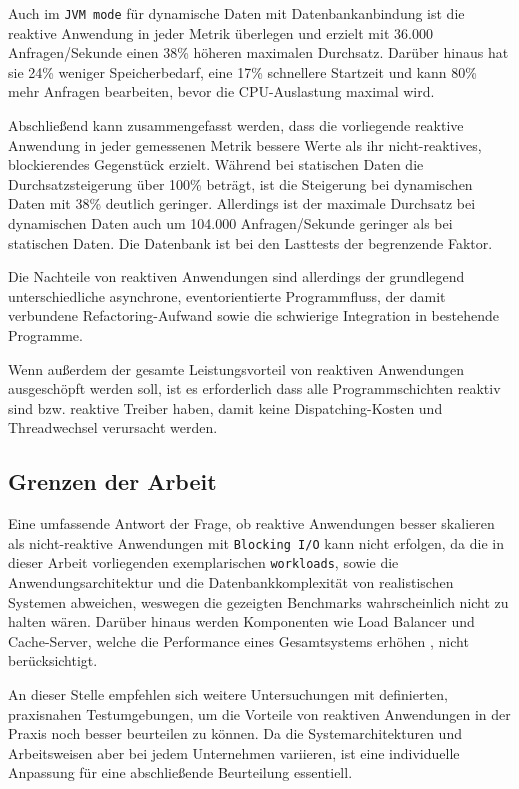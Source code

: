 Auch im \verb|JVM mode| für dynamische Daten mit Datenbankanbindung ist die reaktive Anwendung in jeder Metrik überlegen und erzielt
mit 36.000 Anfragen/Sekunde einen 38\% höheren maximalen Durchsatz. Darüber hinaus hat sie 24\% weniger Speicherbedarf, eine 17\% schnellere
Startzeit und kann 80\% mehr Anfragen bearbeiten, bevor die CPU-Auslastung maximal wird.

Abschließend kann zusammengefasst werden, dass die vorliegende reaktive Anwendung in jeder gemessenen Metrik bessere Werte als ihr
nicht-reaktives, blockierendes Gegenstück erzielt.
Während bei statischen Daten die Durchsatzsteigerung über 100\% beträgt, ist die
Steigerung bei dynamischen Daten mit 38\% deutlich geringer.
Allerdings ist der maximale Durchsatz bei dynamischen Daten auch
um 104.000 Anfragen/Sekunde geringer als bei statischen Daten. Die Datenbank ist bei den Lasttests der begrenzende Faktor.

Die Nachteile von reaktiven Anwendungen sind allerdings der grundlegend unterschiedliche asynchrone, eventorientierte Programmfluss,
der damit verbundene Refactoring-Aufwand sowie die schwierige Integration in bestehende Programme.

Wenn außerdem der gesamte Leistungsvorteil von reaktiven Anwendungen ausgeschöpft werden soll, ist es erforderlich
dass alle Programmschichten reaktiv sind bzw. reaktive Treiber haben, damit keine Dispatching-Kosten und Threadwechsel
verursacht werden.

\subsection{Grenzen der Arbeit}
\label{subsec:grenzen_der_arbeit}
Eine umfassende Antwort der Frage, ob reaktive Anwendungen besser skalieren als nicht-reaktive Anwendungen
mit \verb|Blocking I/O| kann nicht erfolgen, da die in dieser Arbeit vorliegenden exemplarischen \verb|workloads|, sowie
die Anwendungsarchitektur und die Datenbankkomplexität von realistischen Systemen abweichen, weswegen die gezeigten Benchmarks
wahrscheinlich nicht zu halten wären.
Darüber hinaus werden Komponenten wie Load Balancer und Cache-Server, welche die Performance eines Gesamtsystems erhöhen ,
nicht berücksichtigt.

An dieser Stelle empfehlen sich weitere Untersuchungen mit definierten, praxisnahen Testumgebungen, um die Vorteile
von reaktiven Anwendungen in der Praxis noch besser beurteilen zu können.
Da die Systemarchitekturen und Arbeitsweisen aber bei jedem Unternehmen variieren, ist eine individuelle Anpassung
für eine abschließende Beurteilung essentiell.

